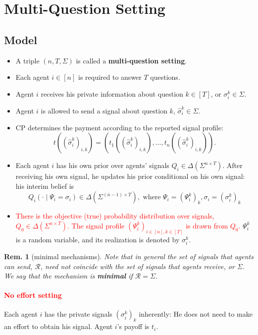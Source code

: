\documentclass[11pt,a4paper,dvipdfmx]{article}
\theoremstyle{plain}
\newtheorem{rem}{Rem.}[section]
\newcommand{\mR}{\mathcal{R}}
\renewcommand{\hat}{\widehat}
\newcommand{\1}{\mathbbm{1}}
\newcommand{\ocomment}[1]{{\textcolor{red}{#1}}}
\begin{document}
\newpage
\section{Multi-Question Setting}
\subsection{Model}
\begin{itemize}
	\item A triple $(n, T, \Sigma)$ is called a \textbf{multi-question setting}.
	\item Each agent $i \in [n]$ is required to answer $T$ questions.
	\item Agent $i$ receives his private information about question $k \in [T]$, or $\sigma_i^k \in \Sigma$.
	\item Agent $i$ is allowed to send a signal about question $k$, $\hat{\sigma}_i^k \in \Sigma$.
	\item CP determines the payment according to the reported signal profile:
	$$t((\hat{\sigma}_i^k)_{i,k}) = \left(t_1((\hat{\sigma}_i^k)_{i,k}), \dots, t_n((\hat{\sigma}_i^k)_{i,k}) \right).$$
	\item Each agent $i$ has his own prior over agents' signals $Q_i \in \Delta(\Sigma^{n \times T})$. After receiving his own signal, he updates his prior conditional on his own signal: his interim belief is
	$$
	Q_i( \cdot \mid \Psi_i = \sigma_i) \in \Delta(\Sigma^{(n-1) \times T}), \text{ where } \Psi_i = (\Psi_i^k)_k, \sigma_i = (\sigma_i^k)_k
	$$
	\item \ocomment{There is the objective (true) probability distribution over signals, $Q_0 \in \Delta(\Sigma^{n \times T})$. The signal profile $(\Psi_i^k)_{i \in [n],k \in [T]}$ is drawn from $Q_0$.} $\Psi_i^k$ is a random variable, and its realization is denoted by $\sigma_i^k$.
\end{itemize}

\begin{rem}[minimal mechanisms]
	Note that in general the set of signals that agents can send, $\mR$, need not coincide with the set of signals that agents receive, or $\Sigma$. We say that the mechanism is \textbf{minimal} if $\mR = \Sigma$.
\end{rem}

\paragraph{\ocomment{No effort setting}} Each agent $i$ has the private signals $(\sigma_i^k)_k$ inherently: He does not need to make an effort to obtain his signal. Agent $i$'s payoff is $t_i$.
\end{document}
